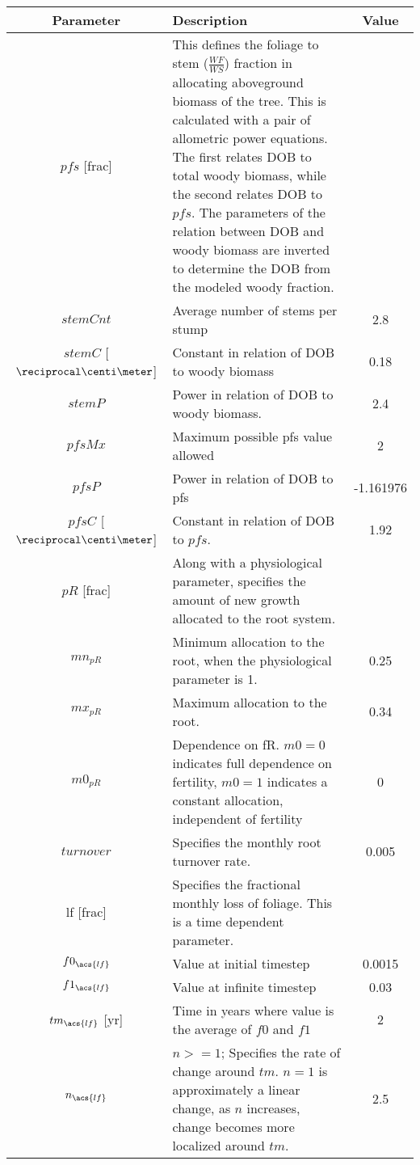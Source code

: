 \begin{tabularx}{\linewidth}{|c|X|c|}
\hline
Parameter & Description & Value\\
\hline
 $pfs$ [frac]  & This defines the foliage to stem ($\frac{WF}{WS}$) fraction in allocating aboveground biomass of the tree. This is calculated with a pair of allometric power equations.  The first relates \acf{DOB} to total woody biomass, while the second relates \ac{DOB} to $pfs$.  The parameters of the relation between \ac{DOB} and woody biomass are inverted to determine the \ac{DOB} from the modeled woody fraction.&\\
 $stemCnt$ & Average number of stems per stump &2.8\\
 $stemC$ [$\reciprocal\centi\meter$] & Constant in relation of \ac{DOB} to woody biomass & 0.18\\
 $stemP$ & Power in relation of \ac{DOB} to woody biomass. & 2.4\\
 $pfsMx$ & Maximum possible pfs value allowed & 2\\
 $pfsP$ & Power in relation of \ac{DOB} to pfs & -1.161976\\
 $pfsC$ [$\reciprocal\centi\meter$] & Constant in relation of \ac{DOB} to $pfs$. & 1.92\\
 \hline
$pR$ [frac] & Along with a physiological parameter, specifies the amount of new growth allocated to the root system. &\\
 $mn_{pR}$ & Minimum allocation to the root, when the physiological parameter is 1. & 0.25\\
 $mx_{pR}$ & Maximum allocation to the root. & 0.34\\
 $m0_{pR}$ & Dependence on \ac{fR}. $m0=0$ indicates full dependence on fertility, $m0=1$ indicates a constant allocation, independent of fertility & 0\\
 $turnover$ & Specifies the monthly root turnover rate. & 0.005\\
 \hline
 \ac{lf} [frac] & Specifies the fractional monthly loss of foliage. This is a time dependent parameter.&\\
 $f0_{\acs{lf}}$ & Value at initial timestep & 0.0015\\
 $f1_{\acs{lf}}$ & Value at infinite timestep & 0.03\\
 $tm_{\acs{lf}}$ [yr] & Time in years where value is the average of $f0$ and $f1$ & 2\\
 $n_{\acs{lf}}$  & $n>=1$; Specifies the rate of change around $tm$.  $n=1$ is approximately a linear change, as $n$ increases, change becomes more localized around $tm$. & 2.5\\
\hline
\end{tabularx}
